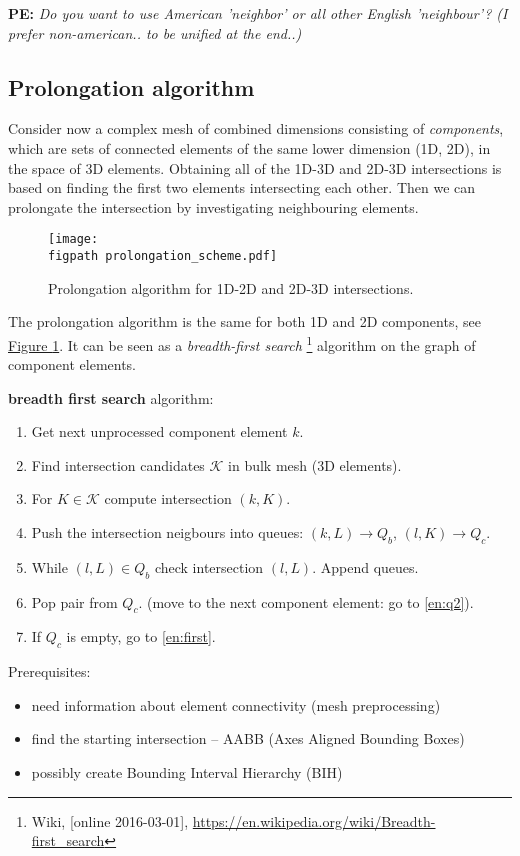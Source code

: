 \documentclass{elsarticle}
\newcommand{\fig}[1]{\hyperref[#1]{Figure \ref{#1}}}
\newcommand{\figpath}{figures/}
\newcommand{\notePE}[1]{{\color{Orange} \textbf{PE: } \textit{#1}}}
\begin{document}
\notePE{Do you want to use American 'neighbor' or all other English 'neighbour'? (I prefer non-american.. to be unified at the end..)}

\subsection{Prolongation algorithm}
Consider now a complex mesh of combined dimensions consisting of \emph{components}, which are sets of connected
elements of the same lower dimension (1D, 2D), in the space of 3D elements. 
Obtaining all of the 1D-3D and 2D-3D intersections is based on finding the first two elements intersecting each other.
Then we can prolongate the intersection by investigating neighbouring elements.
%
\begin{figure}[!htb]
  \centering    
    \texttt{[image: \\figpath prolongation\_scheme.pdf]}
  \caption{Prolongation algorithm for 1D-2D and 2D-3D intersections. }
  \label{fig:prolongation}
\end{figure}

The prolongation algorithm is the same for both 1D and 2D components, see \fig{fig:prolongation}. 
It can be seen as a \emph{breadth-first search}
\footnote{Wiki, [online 2016-03-01], \url{https://en.wikipedia.org/wiki/Breadth-first_search}}
algorithm on the graph of component elements.

\textbf{breadth first search} algorithm:
  \begin{enumerate}
    \item\label{en:first} Get next unprocessed component element $k$.
    \item Find intersection candidates $\mathcal K$ in bulk mesh (3D elements).
    \item \label{en:q2}For $K\in \mathcal K$ compute intersection $(k, K)$.  
    \item Push the intersection neigbours into queues: $(k, L) \to Q_b$, $(l, K) \to Q_c$. 
    \item While $(l, L) \in Q_b$ check intersection $(l, L)$. Append queues.
    \item Pop pair from $Q_c$. (move to the next component element: go to \ref{en:q2}).
    \item If $Q_c$ is empty, go to \ref{en:first}.
  \end{enumerate}
  Prerequisites:
  \begin{itemize}
   \item need information about element connectivity (mesh preprocessing)
   \item find the starting intersection -- AABB (Axes Aligned Bounding Boxes) 
   \item possibly create Bounding Interval Hierarchy (BIH)
  \end{itemize}
\end{document}
